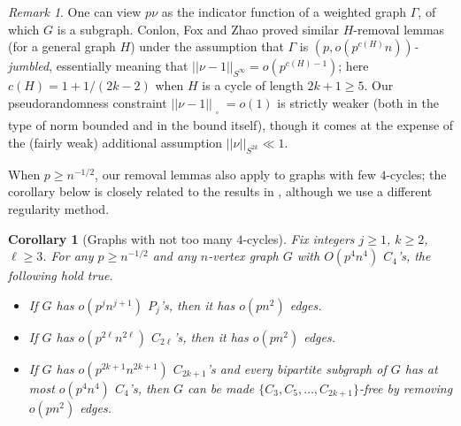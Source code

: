 \documentclass[reqno,11pt]{amsart}
\newtheorem{corollary}[theorem]{Corollary}
\theoremstyle{definition}
\theoremstyle{remark}
\newtheorem*{remark}{Remark}
\numberwithin{equation}{section}
\newcommand{\sq}{_{\substack{ \\ \square}}}
\begin{document}
\begin{remark}
One can view $p \nu$ as the indicator function of a weighted graph $\Gamma$, of which $G$ is a subgraph. Conlon, Fox and Zhao \cite{conlon2014extremal} proved similar $H$-removal lemmas (for a general graph $H$) under the assumption that $\Gamma$ is \emph{$(p, o(p^{c(H)}n))$-jumbled}, essentially meaning that $||\nu - 1||_{S^\infty} = o(p^{c(H) - 1})$; here $c(H) = 1 + 1/(2k-2)$ when $H$ is a cycle of length $2k+1 \ge 5$. Our pseudorandomness constraint $||\nu - 1||\sq = o(1)$ is strictly weaker (both in the type of norm bounded and in the bound itself), though it comes at the expense of the (fairly weak) additional assumption $||\nu||_{S^{2k}} \ll 1$.
\end{remark}


When $p \ge n^{-1/2}$, our removal lemmas also apply to graphs with few $4$-cycles; the corollary below is closely related to the results in \cite{conlon2021regularity,conlon2021graphs}, although we use a different regularity method.

\begin{corollary}[Graphs with not too many $4$-cycles] \label{cor:graphs-few-4-cycles}
Fix integers $j \ge 1$, $k \ge 2$, $\ell \ge 3$. For any $p \ge n^{-1/2}$ and any $n$-vertex graph $G$ with $O(p^4 n^4)$ $C_4$'s, the following hold true.
\begin{itemize}
    \item[$(i)$.] If $G$ has $o(p^{j} n^{j+1})$ $P_{j}$'s, then it has $o(pn^2)$ edges.
    \item[$(ii)$.] If $G$ has $o(p^{2\ell}n^{2\ell})$ $C_{2\ell}$'s, then it has $o(pn^2)$ edges.
    \item[$(iii)$.] If $G$ has $o(p^{2k+1} n^{2k+1})$ $C_{2k+1}$'s and every bipartite subgraph of $G$ has at most $o(p^4n^4)$ $C_4$'s,
    then $G$ can be made $\{C_3, C_5, \ldots, C_{2k+1}\}$-free by removing $o(pn^2)$ edges.
\end{itemize}
\end{corollary}
\end{document}
